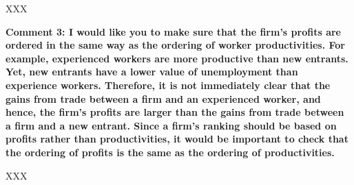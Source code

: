 \documentclass[12pt]{article}
\begin{document}
\begin{onehalfspacing}
\medskip

XXX


\bigskip
\bigskip
\textbf{Comment 3: I would like you to make sure that the firm’s profits are ordered in the same way as the ordering of worker productivities. For example, experienced workers are more productive than new entrants. Yet, new entrants have a lower value of unemployment than experience workers. Therefore, it is not immediately clear that the gains from
trade between a firm and an experienced worker, and hence, the firm’s profits are larger than the
gains from trade between a firm and a new entrant. Since a firm’s ranking should be based on profits rather than productivities, it would be important to check that the ordering of profits is the same as the ordering of productivities.}

\medskip
XXX
\bigskip
\bigskip
\end{onehalfspacing}
\end{document}
